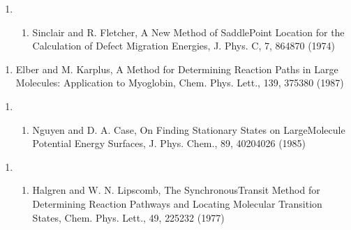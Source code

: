 \documentclass[letterpaper,11pt,english]{sphinxmanual}
\begin{document}
\begin{enumerate}
%
\setcounter{enumi}{9}
\item {} \begin{enumerate}
%
\setcounter{enumii}{4}
\item {} 
Sinclair and R. Fletcher, A New Method of Saddle\sphinxhyphen{}Point Location for the Calculation of Defect Migration Energies, J. Phys. C, 7, 864\sphinxhyphen{}870 (1974)

\end{enumerate}

\end{enumerate}
\begin{enumerate}
%
\setcounter{enumi}{17}
\item {} 
Elber and M. Karplus, A Method for Determining Reaction Paths in Large Molecules:  Application to Myoglobin, Chem. Phys. Lett., 139, 375\sphinxhyphen{}380 (1987)

\end{enumerate}
\begin{enumerate}
%
\setcounter{enumi}{3}
\item {} \begin{enumerate}
%
\setcounter{enumii}{19}
\item {} 
Nguyen and D. A. Case, On Finding Stationary States on Large\sphinxhyphen{}Molecule Potential Energy Surfaces, J. Phys. Chem., 89, 4020\sphinxhyphen{}4026 (1985)

\end{enumerate}

\end{enumerate}
\begin{enumerate}
%
\setcounter{enumi}{19}
\item {} \begin{enumerate}
%
\item {} 
Halgren and W. N. Lipscomb, The Synchronous\sphinxhyphen{}Transit Method for Determining Reaction Pathways and Locating Molecular Transition States, Chem. Phys. Lett., 49, 225\sphinxhyphen{}232 (1977)

\end{enumerate}

\end{enumerate}
\end{document}
